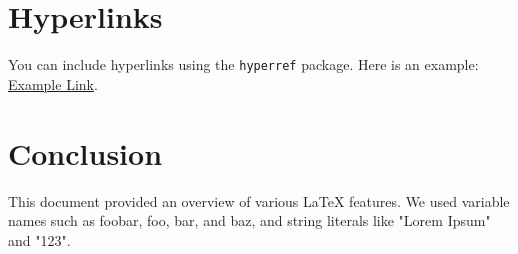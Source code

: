 \documentclass{article}
\begin{document}
\section{Hyperlinks}
You can include hyperlinks using the \texttt{hyperref} package. Here is an example: \href{https://www.example.com}{Example Link}.

\section{Conclusion}
This document provided an overview of various LaTeX features. We used variable names such as foobar, foo, bar, and baz, and string literals like "Lorem Ipsum" and "123".
\end{document}
